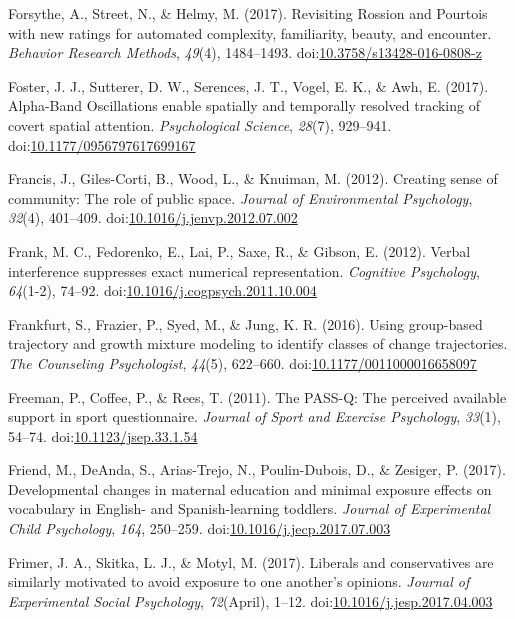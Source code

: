 \documentclass[english,man]{apa6}
\theoremstyle{definition}
\theoremstyle{definition}
\theoremstyle{definition}
\theoremstyle{remark}
\begin{document}
\hypertarget{ref-Forsythe2016}{}
Forsythe, A., Street, N., \& Helmy, M. (2017). Revisiting Rossion and
Pourtois with new ratings for automated complexity, familiarity, beauty,
and encounter. \emph{Behavior Research Methods}, \emph{49}(4),
1484--1493.
doi:\href{https://doi.org/10.3758/s13428-016-0808-z}{10.3758/s13428-016-0808-z}

\hypertarget{ref-Foster2017}{}
Foster, J. J., Sutterer, D. W., Serences, J. T., Vogel, E. K., \& Awh,
E. (2017). Alpha-Band Oscillations enable spatially and temporally
resolved tracking of covert spatial attention. \emph{Psychological
Science}, \emph{28}(7), 929--941.
doi:\href{https://doi.org/10.1177/0956797617699167}{10.1177/0956797617699167}

\hypertarget{ref-Francis2012}{}
Francis, J., Giles-Corti, B., Wood, L., \& Knuiman, M. (2012). Creating
sense of community: The role of public space. \emph{Journal of
Environmental Psychology}, \emph{32}(4), 401--409.
doi:\href{https://doi.org/10.1016/j.jenvp.2012.07.002}{10.1016/j.jenvp.2012.07.002}

\hypertarget{ref-Frank2012}{}
Frank, M. C., Fedorenko, E., Lai, P., Saxe, R., \& Gibson, E. (2012).
Verbal interference suppresses exact numerical representation.
\emph{Cognitive Psychology}, \emph{64}(1-2), 74--92.
doi:\href{https://doi.org/10.1016/j.cogpsych.2011.10.004}{10.1016/j.cogpsych.2011.10.004}

\hypertarget{ref-Frankfurt2016}{}
Frankfurt, S., Frazier, P., Syed, M., \& Jung, K. R. (2016). Using
group-based trajectory and growth mixture modeling to identify classes
of change trajectories. \emph{The Counseling Psychologist},
\emph{44}(5), 622--660.
doi:\href{https://doi.org/10.1177/0011000016658097}{10.1177/0011000016658097}

\hypertarget{ref-Freeman2011}{}
Freeman, P., Coffee, P., \& Rees, T. (2011). The PASS-Q: The perceived
available support in sport questionnaire. \emph{Journal of Sport and
Exercise Psychology}, \emph{33}(1), 54--74.
doi:\href{https://doi.org/10.1123/jsep.33.1.54}{10.1123/jsep.33.1.54}

\hypertarget{ref-Friend2017}{}
Friend, M., DeAnda, S., Arias-Trejo, N., Poulin-Dubois, D., \& Zesiger,
P. (2017). Developmental changes in maternal education and minimal
exposure effects on vocabulary in English- and Spanish-learning
toddlers. \emph{Journal of Experimental Child Psychology}, \emph{164},
250--259.
doi:\href{https://doi.org/10.1016/j.jecp.2017.07.003}{10.1016/j.jecp.2017.07.003}

\hypertarget{ref-Frimer2017}{}
Frimer, J. A., Skitka, L. J., \& Motyl, M. (2017). Liberals and
conservatives are similarly motivated to avoid exposure to one another's
opinions. \emph{Journal of Experimental Social Psychology},
\emph{72}(April), 1--12.
doi:\href{https://doi.org/10.1016/j.jesp.2017.04.003}{10.1016/j.jesp.2017.04.003}
\end{document}
